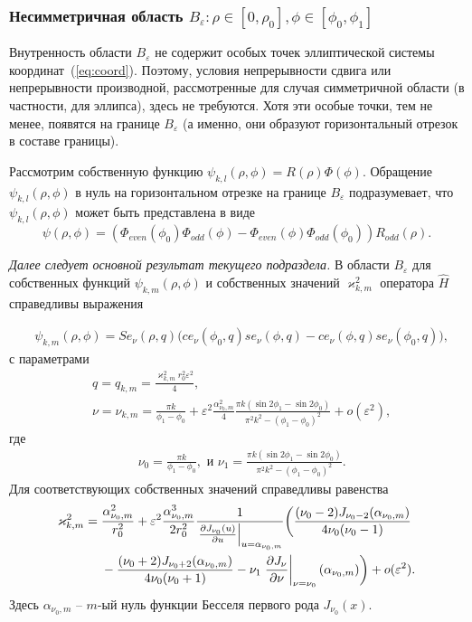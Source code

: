 \subsubsection{Несимметричная область $B_\varepsilon:  \rho \in [0, \rho_0], \phi \in [\phi_0, \phi_1 ]$}\label{sec:ch2/sec4/subs2/subs2}

Внутренность области $B_\varepsilon$ не содержит особых точек эллиптической системы координат~(\ref{eq:coord}). Поэтому, условия непрерывности сдвига или непрерывности производной, рассмотренные для случая симметричной области (в частности, для эллипса), здесь не требуются.
Хотя эти особые точки, тем не менее, появятся на границе  $B_\varepsilon$ (а именно, они образуют горизонтальный отрезок в составе границы).

Рассмотрим собственную функцию $\psi_{k,l}(\rho,\phi) = R(\rho)\Phi(\phi)$.
Обращение  $\psi_{k,l}(\rho,\phi) $ в нуль на горизонтальном отрезке на границе  $B_\varepsilon$
подразумевает, что $\psi_{k,l}(\rho,\phi)$ может быть представлена в виде
\[
\psi(\rho,\phi) = 
    \left(
    \Phi_{even}(\phi_0) \Phi_{odd}(\phi) - \Phi_{even}(\phi) \Phi_{odd}(\phi_0) 
    \right) R_{odd}(\rho).
\]

{\em Далее следует основной результат текущего подраздела.}
В области  $B_\varepsilon$ для собственных функций $\psi_{k, m}(\rho, \phi)$ и собственных значений $\varkappa^2_{k, m}$ оператора $\hat{H}$ справедливы выражения

\begin{align}
&\psi_{k, m}(\rho, \phi) = 
    Se_\nu(\rho, q) \biggl( ce_\nu(\phi_0, q) se_\nu(\phi, q) -ce_\nu(\phi, q) se_\nu(\phi_0, q) \biggr) ,  \label{eq:funB}
\end{align}
с параметрами
\begin{align*}    
    & q=q_{k,m} = \frac{\varkappa_{k,m}^2 r_0^2 \varepsilon^2}{4}, \\ 
&\nu = \nu_{k,m} = \frac{\pi k}{\phi_1-\phi_0} +\varepsilon^2 \frac{\alpha_{\nu_0, m}^2}{4} \frac{\pi k (\sin 2\phi_1 - \sin 2 \phi_0)}{\pi^2k^2-(\phi_1-\phi_0)^2} + o(\varepsilon^2) ,  
\end{align*}
где
\begin{align*}
& \nu_0 = \frac{\pi k}{\phi_1-\phi_0},\text{\ \ и \ \ }
\nu_1= \frac{\pi k (\sin 2\phi_1 - \sin 2 \phi_0)}{\pi^2k^2-(\phi_1-\phi_0)^2} .
\end{align*}
Для соответствующих собственных значений справедливы равенства
\begin{align}
\varkappa_{k, m}^2 ={}& \frac{\alpha_{\nu_0, m}^2}{r_0^2} +  \varepsilon^2 \frac{\alpha_{\nu_0, m}^3}{2 r_0^2}\frac{1}{ \left.\frac{\partial J_{\nu_0}(u)}{\partial u}\right|_{u=\alpha_{\nu_0, m}} }  
 \biggl(\frac{(\nu_0 - 2)J_{\nu_0-2}(\alpha_{\nu_0, m})   }{4\nu_0 (\nu_0-1)} 
\notag \\ 
&{}- \frac{(\nu_0 + 2)J_{\nu_0+2}(\alpha_{\nu_0, m})}{4\nu_0 (\nu_0+1)} 
- \nu_1 \left.\frac{\partial J_\nu}{\partial \nu}\right|_{\nu = \nu_0}(\alpha_{\nu_0, m})
    \biggr) + o(\varepsilon^2).\label{eq:valB}
\end{align}
Здесь $\alpha_{\nu_0,m}$ -- $m$-ый нуль функции Бесселя первого рода $J_{\nu_0}(x)$.


